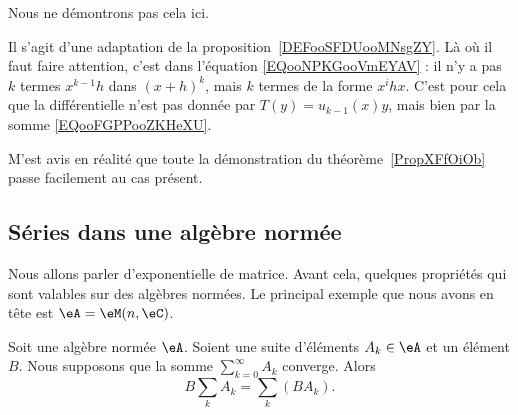 \begin{normaltext}
    Nous ne démontrons pas cela ici.

    Il s'agit d'une adaptation de la proposition~\ref{DEFooSFDUooMNsgZY}. Là où il faut faire attention, c'est dans l'équation \eqref{EQooNPKGooVmEYAV} : il n'y a pas \( k\) termes \( x^{k-1}h\) dans \( (x+h)^k\), mais \( k\) termes de la forme \( x^ihx\). C'est pour cela que la différentielle n'est pas donnée par \( T(y)=u_{k-1}(x)y\), mais bien par la somme \eqref{EQooFGPPooZKHeXU}.

    M'est avis en réalité que toute la démonstration du théorème~\ref{PropXFfOiOb} passe facilement au cas présent.
\end{normaltext}

\subsection{Séries dans une algèbre normée}

Nous allons parler d'exponentielle de matrice. Avant cela, quelques propriétés qui sont valables sur des algèbres normées. Le principal exemple que nous avons en tête est \( \eA=\eM(n,\eC)\).

\begin{proposition}      \label{PROPooMZZQooEhQsgQ}
    Soit une algèbre normée \( \eA\). Soient une suite d'éléments \( A_k\in \eA\) et un élément \( B\). Nous supposons que la somme \( \sum_{k=0}^{\infty}A_k\) converge. Alors
    \begin{equation}
        B\sum_kA_k=\sum_k(BA_k).
    \end{equation}
\end{proposition}


